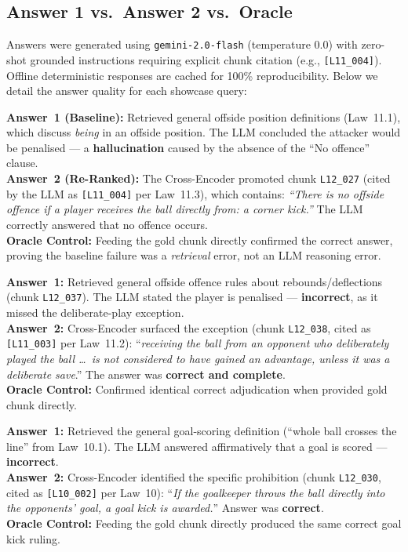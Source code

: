 \documentclass[11pt,a4paper]{article}
\begin{document}
\subsection{Answer 1 vs.\ Answer 2 vs.\ Oracle}

Answers were generated using \texttt{gemini-2.0-flash} (temperature 0.0) with zero-shot grounded instructions requiring explicit chunk citation (e.g., \texttt{[L11\_004]}). Offline deterministic responses are cached for 100\% reproducibility. Below we detail the answer quality for each showcase query:

\begin{description}[style=nextline, leftmargin=1.5em]

\item[\textbf{Q01 --- Keyword Trap (Offside from Corner Kick)}]
\textbf{Answer~1 (Baseline):} Retrieved general offside position definitions
(Law~11.1), which discuss \emph{being} in an offside position.  The LLM
concluded the attacker would be penalised --- a \textbf{hallucination} caused
by the absence of the ``No offence'' clause.\\
\textbf{Answer~2 (Re-Ranked):} The Cross-Encoder promoted chunk
\texttt{L12\_027} (cited by the LLM as \texttt{[L11\_004]} per Law~11.3),
which contains: \emph{``There is no offside offence if a player receives the ball
directly from: a corner kick.''} The LLM correctly answered that no offence occurs.\\
\textbf{Oracle Control:} Feeding the gold chunk directly confirmed the correct
answer, proving the baseline failure was a \emph{retrieval} error, not an
LLM reasoning error.

\item[\textbf{Q05 --- Exception (Deliberate Play)}]
\textbf{Answer~1:} Retrieved general offside offence rules about
rebounds/deflections (chunk \texttt{L12\_037}).  The LLM stated the player is penalised ---
\textbf{incorrect}, as it missed the deliberate-play exception.\\
\textbf{Answer~2:} Cross-Encoder surfaced the exception (chunk \texttt{L12\_038}, cited as \texttt{[L11\_003]} per Law~11.2):
``\emph{receiving the ball from an opponent who deliberately played the ball \ldots\ is not
considered to have gained an advantage, unless it was a deliberate save}.''
The answer was \textbf{correct and complete}.\\
\textbf{Oracle Control:} Confirmed identical correct adjudication when provided gold chunk directly.

\item[\textbf{Q09 --- Negation (Goalkeeper Throwing into Goal)}]
\textbf{Answer~1:} Retrieved the general goal-scoring definition (``whole
ball crosses the line'' from Law~10.1).  The LLM answered affirmatively that a goal is
scored --- \textbf{incorrect}.\\
\textbf{Answer~2:} Cross-Encoder identified the specific prohibition (chunk \texttt{L12\_030}, cited as \texttt{[L10\_002]} per Law~10):
``\emph{If the goalkeeper throws the ball directly into the opponents' goal,
a goal kick is awarded.}''  Answer was \textbf{correct}.\\
\textbf{Oracle Control:} Feeding the gold chunk directly produced the same correct goal kick ruling.


\end{description}
\end{document}
